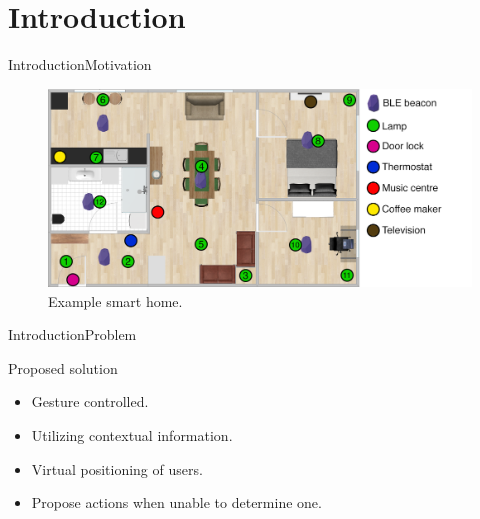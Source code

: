 \section{Introduction}


\begin{frame}{Introduction}{Motivation}
\begin{figure}[h]
\centering
\includegraphics[width=\textwidth]{../images/room-with-beacons}
\caption{Example smart home.}
\end{figure}
\end{frame}

\begin{frame}{Introduction}{Problem}
\begin{block}{Proposed solution}
  \begin{itemize}
    \item Gesture controlled.
    \item Utilizing contextual information.
    \item Virtual positioning of users.
    \item Propose actions when unable to determine one.
  \end{itemize}
\end{block}
\end{frame}

